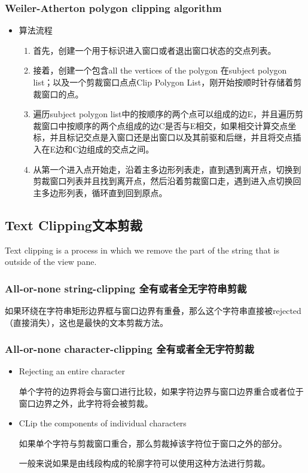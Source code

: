 \documentclass[UTF8]{ctexart}
\begin{document}
\subsubsection{Weiler-Atherton polygon clipping algorithm}
\begin{itemize}
    \item 算法流程
    \begin{enumerate}
        \item 首先，创建一个用于标识进入窗口或者退出窗口状态的交点列表。
        \item 接着，创建一个包含all the vertices of the polygon 在subject polygon list；以及一个剪裁窗口点点Clip Polygon List，刚开始按顺时针存储着剪裁窗口的点。
        \item 遍历subject polygon list中的按顺序的两个点可以组成的边E，并且遍历剪裁窗口中按顺序的两个点组成的边C是否与E相交，如果相交计算交点坐标，并且标记交点是入窗口还是出窗口以及其前驱和后继，并且将交点插入在E边和C边组成的交点之间。
        \item 从第一个进入点开始走，沿着主多边形列表走，直到遇到离开点，切换到剪裁窗口列表并且找到离开点，然后沿着剪裁窗口走，遇到进入点切换回主多边形列表，循环直到回到原点。
    \end{enumerate}
\end{itemize}


\subsection{Text Clipping文本剪裁}
Text clipping is a process in which we remove the part of the string that is outside of the view pane.

\subsubsection{All-or-none string-clipping 全有或者全无字符串剪裁}
如果环绕在字符串矩形边界框与窗口边界有重叠，那么这个字符串直接被rejected（直接消失），这也是最快的文本剪裁方法。


\subsubsection{All-or-none character-clipping 全有或者全无字符剪裁}

\begin{itemize}
    \item Rejecting an entire character
    
    单个字符的边界将会与窗口进行比较，如果字符边界与窗口边界重合或者位于窗口边界之外，此字符将会被剪裁。

    \item CLip the components of individual characters
    
    如果单个字符与剪裁窗口重合，那么剪裁掉该字符位于窗口之外的部分。

    一般来说如果是由线段构成的轮廓字符可以使用这种方法进行剪裁。
\end{itemize}
\end{document}
